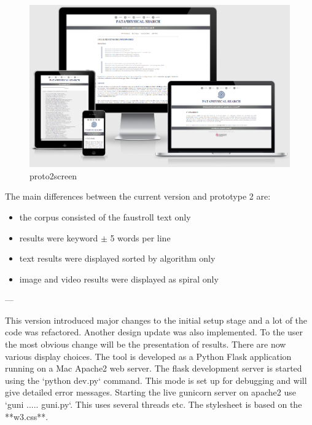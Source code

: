 \begin{figure}[!htbp] %
  \centering
  \includegraphics[width=\linewidth]{images/proto2screen}
\caption[proto2screen]{proto2screen}
\label{img:proto2screen}
\end{figure}

The main differences between the current version and prototype 2 are:
\begin{itemize}
  \item the corpus consisted of the faustroll text only
  \item results were keyword $\pm$ 5 words per line
  \item text results were displayed sorted by algorithm only
  \item image and video results were displayed as spiral only
\end{itemize}

---

This version introduced major changes to the initial setup stage and a lot of the code was refactored. Another design update was also implemented. To the user the most obvious change will be the presentation of results. There are now various display choices. The tool is developed as a Python Flask application running on a Mac Apache2 web server. The flask development server is started using the `python dev.py` command. This mode is set up for debugging and will give detailed error messages. Starting the live gunicorn server on apache2 use `guni ..... guni.py`. This uses several threads etc. The stylesheet is based on the **w3.css**.


\stopcontents[chapters]

